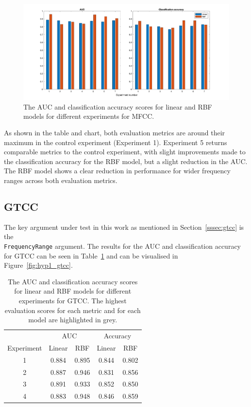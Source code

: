 \begin{figure}[ht]
  \centering
  \includegraphics[width=\textwidth]{figures/hyp1_mfcc.png}
  \caption{The AUC and classification accuracy scores for linear and RBF models
  for different experiments for MFCC.}\label{fig:hyp1_mfcc}
\end{figure}

As shown in the table and chart, both evaluation metrics are around their
maximum in the control experiment (Experiment 1). Experiment 5 returns
comparable metrics to the control experiment, with slight improvements made to
the classification accuracy for the RBF model, but a slight reduction in the
AUC\@. The RBF model shows a clear reduction in performance for wider frequency
ranges across both evaluation metrics.

\subsection{GTCC}

The key argument under test in this work as mentioned in
Section~\ref{sssec:gtcc} is the \\ \texttt{FrequencyRange} argument. The results
for the AUC and classification accuracy for GTCC can be seen in
Table~\ref{table:hyp1_gtcc} and can be visualised in Figure~\ref{fig:hyp1_gtcc}.

\begin{table}[ht]
\begin{center}
\begin{tabular}{c c c|c c}
\toprule
& \multicolumn{2}{c|}{AUC} & \multicolumn{2}{c}{Accuracy} \\
  Experiment & Linear & RBF & Linear & RBF \\ [0.5ex]
\midrule
  1 & 0.884 & 0.895 & 0.844 & 0.802 \\
  2 & 0.887 & 0.946 & 0.831 & 0.856 \\
  3 & \cellcolor{lightgray} 0.891 & 0.933 & \cellcolor{lightgray} 0.852 & 0.850 \\
  4 & 0.883 & \cellcolor{lightgray} 0.948 & 0.846 & \cellcolor{lightgray} 0.859 \\
\bottomrule
\end{tabular}
\caption{The AUC and classification accuracy scores for linear and RBF models
for different experiments for GTCC\@. The highest evaluation scores for each metric
and for each model are highlighted in grey.}\label{table:hyp1_gtcc}
\end{center}
\end{table}

